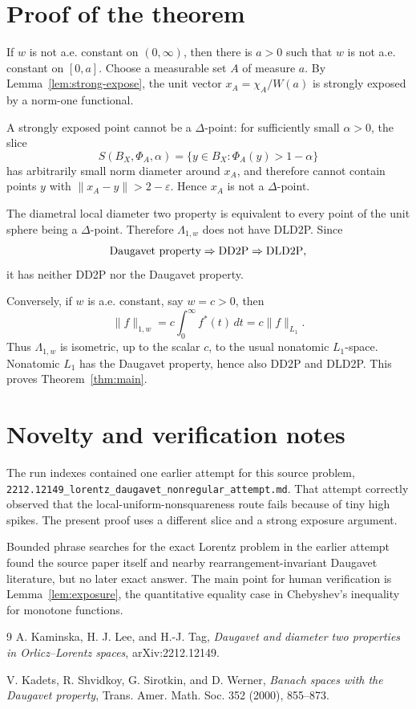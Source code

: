 \documentclass[11pt]{article}
\newcommand{\eps}{\varepsilon}
\begin{document}
\section*{Proof of the theorem}

If \(w\) is not a.e. constant on \((0,\infty)\), then there is \(a>0\) such
that \(w\) is not a.e. constant on \([0,a]\).  Choose a measurable set
\(A\) of measure \(a\).  By Lemma~\ref{lem:strong-expose}, the unit vector
\(x_A=\chi_A/W(a)\) is strongly exposed by a norm-one functional.

A strongly exposed point cannot be a \(\Delta\)-point: for sufficiently small
\(\alpha>0\), the slice
\[
  S(B_X,\Phi_A,\alpha)=\{y\in B_X:\Phi_A(y)>1-\alpha\}
\]
has arbitrarily small norm diameter around \(x_A\), and therefore cannot
contain points \(y\) with \(\|x_A-y\|>2-\eps\).  Hence \(x_A\) is not a
\(\Delta\)-point.

The diametral local diameter two property is equivalent to every point of the
unit sphere being a \(\Delta\)-point.  Therefore \(\Lambda_{1,w}\) does not
have DLD2P.  Since
\[
  \hbox{Daugavet property}\Rightarrow \hbox{DD2P}\Rightarrow \hbox{DLD2P},
\]
it has neither DD2P nor the Daugavet property.

Conversely, if \(w\) is a.e. constant, say \(w=c>0\), then
\[
  \|f\|_{1,w}=c\int_0^\infty f^*(t)\,dt=c\|f\|_{L_1}.
\]
Thus \(\Lambda_{1,w}\) is isometric, up to the scalar \(c\), to the usual
nonatomic \(L_1\)-space.  Nonatomic \(L_1\) has the Daugavet property, hence
also DD2P and DLD2P.  This proves Theorem~\ref{thm:main}.

\section*{Novelty and verification notes}

The run indexes contained one earlier attempt for this source problem,
\texttt{2212.12149\_lorentz\_daugavet\_nonregular\_attempt.md}.  That attempt
correctly observed that the local-uniform-nonsquareness route fails because
of tiny high spikes.  The present proof uses a different slice and a strong
exposure argument.

Bounded phrase searches for the exact Lorentz problem in the earlier attempt
found the source paper itself and nearby rearrangement-invariant Daugavet
literature, but no later exact answer.  The main point for human verification
is Lemma~\ref{lem:exposure}, the quantitative equality case in Chebyshev's
inequality for monotone functions.

\begin{thebibliography}{9}
A. Kaminska, H. J. Lee, and H.-J. Tag,
\emph{Daugavet and diameter two properties in Orlicz--Lorentz spaces},
arXiv:2212.12149.

V. Kadets, R. Shvidkoy, G. Sirotkin, and D. Werner,
\emph{Banach spaces with the Daugavet property},
Trans. Amer. Math. Soc. 352 (2000), 855--873.
\end{thebibliography}
\end{document}
